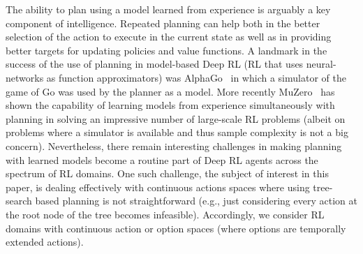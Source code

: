 \documentclass[nohyperref]{article}
\theoremstyle{plain}
\theoremstyle{definition}
\theoremstyle{remark}
\begin{document}

\printAffiliationsAndNotice{}  %

\begin{abstract}
Planning with a learned model is arguably a key component of intelligence. There are several challenges in realizing such a component in large-scale reinforcement learning (RL) problems. One such challenge is dealing effectively with continuous action spaces when using tree-search planning (e.g., it is not feasible to consider every action even at just the root node of the tree). In this paper we present a method for \emph{selecting} affordances useful for planning---for learning which small number of actions/options from a continuous space of actions/options to consider in the tree-expansion process during planning. We consider affordances that are goal-and-state-conditional mappings to actions/options as well as unconditional affordances that simply select actions/options available in all states. Our selection method is gradient based: we compute gradients through the planning procedure to update the parameters of the function that represents affordances. Our empirical work shows that it is feasible to learn to select both primitive-action and option  affordances, and that simultaneously learning to select affordances and planning with a learned value-equivalent model can outperform model-free RL. 
\end{abstract}

The ability to plan using a model learned from experience is arguably a key component of intelligence. Repeated planning can help both in the better selection of the action to execute in the current state as well as in providing better targets for updating policies and value functions. A landmark in the success of the use of planning in model-based Deep RL (RL that uses neural-networks as function approximators) was AlphaGo~\citep{silver2017mastering} in which a simulator of the game of Go was used by the planner as a model. More recently MuZero~\citep{schrittwieser2020mastering} has shown the capability of learning models from experience simultaneously with planning in solving an impressive number of large-scale RL problems (albeit on problems where a simulator is available and thus sample complexity is not a big concern). Nevertheless, there remain interesting challenges in making planning with learned models become a routine part of Deep RL agents across the spectrum of RL domains. One such challenge, the subject of interest in this paper, is dealing effectively with continuous actions spaces where using tree-search based planning is not straightforward (e.g., just considering every action at the root node of the tree becomes infeasible). Accordingly, we consider RL domains with continuous action or option spaces (where options are temporally extended actions). 
\end{document}
